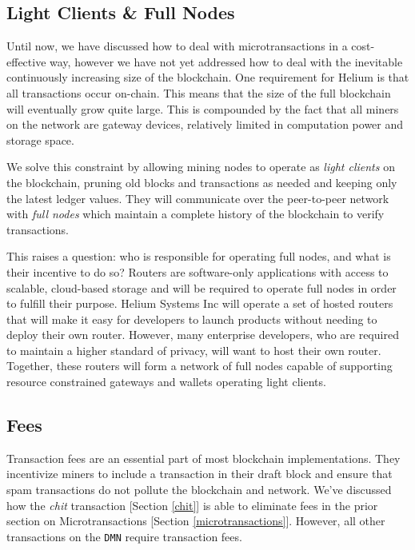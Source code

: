\documentclass[10pt, nonatbib, nocopyrightspace, reprint]{sigplanconf}
\begin{document}
\subsection{Light Clients \& Full Nodes} \label{full-nodes}

Until now, we have discussed how to deal with microtransactions in a cost-effective way, however we have not yet addressed how to deal with the inevitable continuously increasing size of the blockchain. One requirement for Helium is that all transactions occur on-chain. This means that the size of the full blockchain will eventually grow quite large. This is compounded by the fact that all miners on the network are gateway devices, relatively limited in computation power and storage space.

We solve this constraint by allowing mining nodes to operate as \emph{light clients} on the blockchain, pruning old blocks and transactions as needed and keeping only the latest ledger values. They will communicate over the peer-to-peer network with \emph{full nodes} which maintain a complete history of the blockchain to verify transactions.

This raises a question: who is responsible for operating full nodes, and what is their incentive to do so? Routers are software-only applications with access to scalable, cloud-based storage and will be required to operate full nodes in order to fulfill their purpose. Helium Systems Inc will operate a set of hosted routers that will make it easy for developers to launch products without needing to deploy their own router. However, many enterprise developers, who are required to maintain a higher standard of privacy, will want to host their own router. Together, these routers will form a network of full nodes capable of supporting resource constrained gateways and wallets operating light clients.

\subsection{Fees} \label{fees}

Transaction fees are an essential part of most blockchain implementations. They incentivize miners to include a transaction in their draft block and ensure that spam transactions do not pollute the blockchain and network. We've discussed how the \emph{chit} transaction [Section \ref{chit}] is able to eliminate fees in the prior section on Microtransactions [Section \ref{microtransactions}]. However, all other transactions on the \verb|DMN| require transaction fees.
\end{document}
